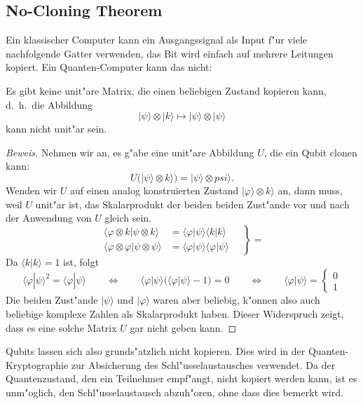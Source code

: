 \subsection{No-Cloning Theorem}
Ein klassischer Computer kann ein Ausgangssignal als Input f"ur viele
nachfolgende Gatter verwenden, das Bit wird einfach auf mehrere Leitungen
kopiert. 
Ein Quanten-Computer kann das nicht:
\begin{satz}
\label{skript:no-cloning-theorem}
Es gibt keine unit"are Matrix, die einen beliebigen Zustand kopieren
kann, d.~h.~die Abbildung
\[
|\psi\rangle\otimes|k\rangle\mapsto |\psi\rangle\otimes|\psi\rangle
\]
kann nicht unit"ar sein.
\end{satz}

\begin{proof}[Beweis]
Nehmen wir an, es g"abe eine unit"are Abbildung $U$, die ein Qubit clonen
kann:
\[
U(|\psi\rangle\otimes k\rangle)=|\psi\rangle\otimes psi\rangle.
\]
Wenden wir $U$ auf einen analog konstruierten Zustand
$|\varphi\rangle\otimes k\rangle$ an, dann muss, weil $U$ unit"ar ist,
das Skalarprodukt der beiden beiden Zust"ande vor und nach der Anwendung
von $U$ gleich sein.
\begin{equation}
\left.
\begin{aligned}
\langle\varphi\otimes k|\psi\otimes k\rangle
&=
\langle\varphi|\psi\rangle \langle k|k\rangle
\\
\langle\varphi\otimes\varphi|\psi\otimes\psi\rangle
&=
\langle\varphi|\psi\rangle \langle \varphi|\psi\rangle
\end{aligned}
\quad
\right\}=
\end{equation}
Da $\langle k|k\rangle=1$ ist, folgt
\[
\langle \varphi|\psi\rangle^2=
\langle \varphi|\psi\rangle
\qquad\Leftrightarrow\qquad
\langle \varphi|\psi\rangle ( \langle \varphi|\psi\rangle -1) = 0
\qquad\Leftrightarrow\qquad
\langle \varphi|\psi\rangle =\begin{cases}0\\1\end{cases}
\]
Die beiden Zust"ande $|\psi\rangle$ und $|\varphi\rangle$ waren aber
beliebig, k"onnen also auch beliebige komplexe Zahlen als Skalarprodukt
haben.
Dieser Widerspruch zeigt, dass es eine solche Matrix $U$ gar nicht
geben kann.
\end{proof}

Qubits lassen sich also grunds"atzlich nicht kopieren.
Dies wird in der Quanten-Kryptographie zur Absicherung des
Schl"usselaustausches verwendet. 
Da der Quantenzustand, den ein Teilnehmer empf"angt, nicht kopiert
werden kann, ist es unm"oglich, den Schl"usselaustausch abzuh"oren,
ohne dass dies bemerkt wird.

